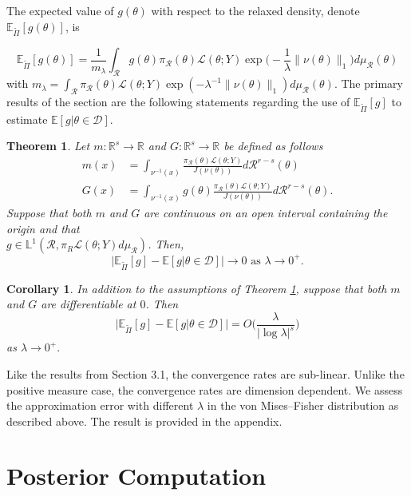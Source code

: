 \documentclass[10pt,fleqn]{article} \pdfoutput=1
\newtheorem{theorem}{Theorem} \newtheorem{lemma}{Lemma}
\newtheorem{corollary}{Corollary} \newtheorem{remark}{Remark}
\newcommand{\bb}[1]{\mathbb{#1}} \newcommand{\mc}[1]{\mathcal{#1}}
\DeclareMathOperator{\1}{\mathbbm{1}} \DeclareMathOperator{\bigO}{\mc O}
\begin{document}
The expected value of
$g(\theta)$ with respect to the relaxed density, denote
$\bb E_{\tilde{\Pi}}[g(\theta)] $, is

$$\bb E_{\tilde{\Pi}}[g(\theta)] = \frac{1}{m_\lambda}
\int_\mathcal{R} g(\theta) \pi_\mathcal{R}(\theta)
\mathcal{L}(\theta;Y)\exp\bigg(-\frac{1}{\lambda}\|\nu (\theta)\|_1\bigg)
d\mu_\mathcal{R}(\theta) $$
with $m_\lambda =
\int_\mathcal{R}  \pi_\mathcal{R}(\theta)
\mathcal{L}(\theta;Y)\exp(-{\lambda^{-1}}\|\nu (\theta)\|_1)
d\mu_\mathcal{R}(\theta).$
The primary results of the section are the following statements regarding
the use of $\bb E_{\tilde{\Pi}}[g]$ to estimate $\bb E[g|\theta\in\mathcal{D}]$.

\begin{theorem} \label{THM:Relaxed_Expectation_Convergence_Measure_Zero}
Let $m:\mathbb{R}^s\to \mathbb{R}$ and $G:\mathbb{R}^s\to
\mathbb{R}$ be defined as follows \begin{align*} m(x) & =
\int_{\nu^{-1}(x)} \frac{\pi_\mathcal{R}(\theta)
\mathcal{L}(\theta;Y)}{J(\nu(\theta))}
d\mathcal{R}^{r-s}(\theta) \\ G(x) &= \int_{\nu^{-1}(x)}
g(\theta)\frac{\pi_\mathcal{R}(\theta)
\mathcal{L}(\theta;Y)}{J(\nu(\theta))} d\mathcal{R}^{r-s}(\theta).
\end{align*} Suppose that both $m$ and $G$ are continuous on an open
interval containing the origin and that \\
$g\in\mathbb{L}^1(\mathcal{R},\pi_R\mathcal{L}(\theta;Y)d\mu_\mathcal{R})$.
Then, $$\bigg|\bb E_{\tilde{\Pi}}[g] - \bb E[g|\theta \in \mathcal{D}]\bigg| \to 0
\text{ as } \lambda\to 0^+.$$ \end{theorem}

\begin{corollary} In addition to the assumptions of Theorem
\ref{THM:Relaxed_Expectation_Convergence_Measure_Zero}, suppose
that both $m$ and $G$ are differentiable at $0$. Then
$$\bigg|\bb E_{\tilde{\Pi}}[g] - \bb E[g|\theta \in \mathcal{D}] \bigg| =
O\bigg(\frac{\lambda}{|\log \lambda|^s}\bigg)$$ as $\lambda \to
0^+.$ \end{corollary}

Like the results from Section 3.1, the convergence rates are sub-linear. Unlike the positive measure case, the convergence rates are dimension dependent. We assess the approximation error with different $\lambda$ in the von Mises--Fisher distribution as described above. The result is provided in the appendix. 


\section{Posterior Computation}
\end{document}
